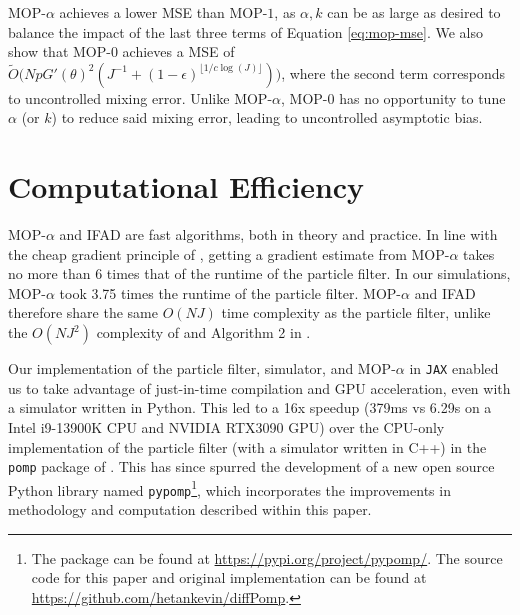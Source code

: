 \documentclass[numsec,webpdf,modern,medium,namedate]{oup-authoring-template}
\theoremstyle{thmstyleone}%
\theoremstyle{thmstyletwo}%
\theoremstyle{thmstylethree}%
\begin{document}
MOP-$\alpha$ achieves a lower MSE than MOP-$1$, as $\alpha, k$ can be as large as desired to balance the impact of the last three terms of Equation \ref{eq:mop-mse}. We also show that MOP-$0$ achieves a MSE of $\tilde{O}\big(NpG'(\theta)^2(J^{-1}+(1-\epsilon)^{\lfloor1/c\log(J)\rfloor})\big)$, where the second term corresponds to uncontrolled mixing error. Unlike MOP-$\alpha$, MOP-$0$ has no opportunity to tune $\alpha$ (or $k$) to reduce said mixing error, leading to uncontrolled asymptotic bias. 



\section{Computational Efficiency}

MOP-$\alpha$ and IFAD are fast algorithms, both in theory and practice. 
In line with the cheap gradient principle of \cite{kakade2019provably}, getting a gradient estimate from MOP-$\alpha$ takes no more than 6 times that of the runtime of the particle filter. In our simulations, MOP-$\alpha$ took 3.75 times the runtime of the particle filter. 
MOP-$\alpha$ and IFAD therefore share the same $O(NJ)$ time complexity as the particle filter, unlike the $O(NJ^2)$ complexity of \cite{corenflos21} and Algorithm 2 in \citep{poyiadjis11, scibior21}.



Our implementation of the particle filter, simulator, and MOP-$\alpha$ in \texttt{JAX} \citep{jax} enabled us to take advantage of just-in-time compilation and GPU acceleration, even with a simulator written in Python. This led to a 16x speedup (379ms vs 6.29s on a Intel i9-13900K CPU and NVIDIA RTX3090 GPU) over the CPU-only implementation of the particle filter (with a simulator written in C++) in the \texttt{pomp} package of \cite{king16}. This has since spurred the development of a new open source Python library named \texttt{pypomp}\footnote{The package can be found at \href{https://pypi.org/project/pypomp/}{https://pypi.org/project/pypomp/}. The source code for this paper and original implementation can be found at \href{https://github.com/hetankevin/diffPomp}{https://github.com/hetankevin/diffPomp}.}, which incorporates the improvements in methodology and computation described within this paper.

\end{document}
